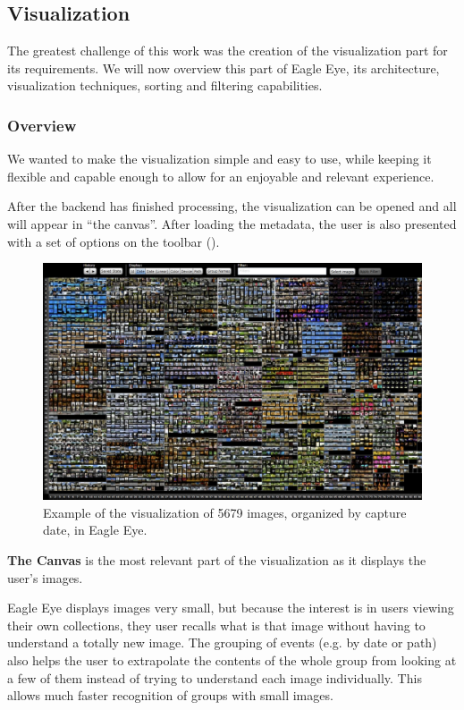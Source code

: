 \subsection{Visualization} %
\label{sub:visualization}

The greatest challenge of this work was the creation of the visualization part for its requirements. We will now overview this part of Eagle Eye, its architecture, visualization techniques, sorting and filtering capabilities.

\subsubsection{Overview}
We wanted to make the visualization simple and easy to use, while keeping it flexible and capable enough to allow for an enjoyable and relevant experience.

After the backend has finished processing, the visualization can be opened and all will appear in ``the canvas''. After loading the metadata, the user is also presented with a set of options on the toolbar ().


\begin{figure}[ht]
	\centering
		\includegraphics[width=\columnwidth]{../Figures/viz5679images1280.pdf}
	\caption{Example of the visualization of 5679 images, organized by capture date, in Eagle Eye.}
	\label{fig:viz5679images}
\end{figure}



\textbf{The Canvas} is the most relevant part of the visualization as it displays the user's images.

Eagle Eye displays images very small, but because the interest is in users viewing their own collections, they user recalls what is that image without having to understand a totally new image. The grouping of events (e.g. by date or path) also helps the user to extrapolate the contents of the whole group from looking at a few of them instead of trying to understand each image individually. This allows much faster recognition of groups with small images.

